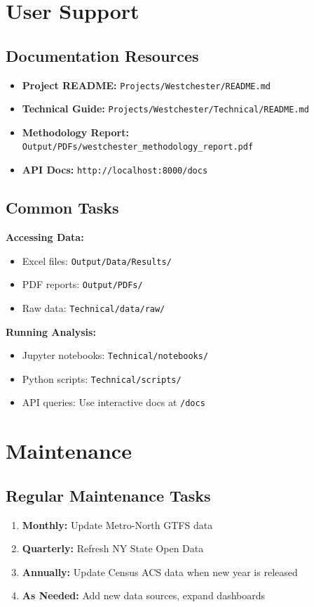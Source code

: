 \documentclass[11pt,letterpaper]{article}
\begin{document}
\section{User Support}

\subsection{Documentation Resources}
\begin{itemize}
    \item \textbf{Project README:} \texttt{Projects/Westchester/README.md}
    \item \textbf{Technical Guide:} \texttt{Projects/Westchester/Technical/README.md}
    \item \textbf{Methodology Report:} \texttt{Output/PDFs/westchester\_methodology\_report.pdf}
    \item \textbf{API Docs:} \texttt{http://localhost:8000/docs}
\end{itemize}

\subsection{Common Tasks}

\textbf{Accessing Data:}
\begin{itemize}
    \item Excel files: \texttt{Output/Data/Results/}
    \item PDF reports: \texttt{Output/PDFs/}
    \item Raw data: \texttt{Technical/data/raw/}
\end{itemize}

\textbf{Running Analysis:}
\begin{itemize}
    \item Jupyter notebooks: \texttt{Technical/notebooks/}
    \item Python scripts: \texttt{Technical/scripts/}
    \item API queries: Use interactive docs at \texttt{/docs}
\end{itemize}

\section{Maintenance}

\subsection{Regular Maintenance Tasks}
\begin{enumerate}
    \item \textbf{Monthly:} Update Metro-North GTFS data
    \item \textbf{Quarterly:} Refresh NY State Open Data
    \item \textbf{Annually:} Update Census ACS data when new year is released
    \item \textbf{As Needed:} Add new data sources, expand dashboards
\end{enumerate}
\end{document}
